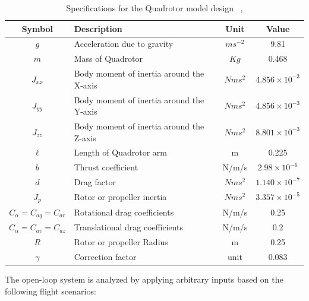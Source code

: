 \begin{table}[h!]
\centering
\caption{Specifications for the Quadrotor model design ~\cite{ahmed2018sliding},\cite{bernard2017dynamic}}
\label{tab:quad_params}
\begin{tabular}{|c|l|c|c|}
\hline
\textbf{Symbol} & \textbf{Description} & \textbf{Unit} & \textbf{Value} \\ \hline
$g$     & Acceleration due to gravity              & $ms^{-2}$  & 9.81 \\ \hline
$m$     & Mass of Quadrotor                        & $Kg$       & 0.468 \\ \hline
$J_{xx}$ & Body moment of inertia around the X-axis & $Nms^2$    & $4.856 \times 10^{-3}$ \\ \hline
$J_{yy}$ & Body moment of inertia around the Y-axis & $Nms^2$    & $4.856 \times 10^{-3}$ \\ \hline
$J_{zz}$ & Body moment of inertia around the Z-axis & $Nms^2$    & $8.801 \times 10^{-3}$ \\ \hline
$\ell$   & Length of Quadrotor arm                 & m          & 0.225 \\ \hline
$b$     & Thrust coefficient                       & N/m/s      & $2.98 \times 10^{-6}$ \\ \hline
$d$     & Drag factor                              & $Nms^2$    & $1.140 \times 10^{-7}$ \\ \hline
$J_p$   & Rotor or propeller inertia               & $Nms^2$    & $3.357 \times 10^{-5}$ \\ \hline
$C_{\alpha} = C_{aq} = C_{ar}$ & Rotational drag coefficients & N/m/s & 0.25 \\ \hline
$C_{\alpha} = C_{av} = C_{az}$ & Translational drag coefficients & N/m/s & 0.2 \\ \hline
$R$     & Rotor or propeller Radius                & m          & 0.25 \\ \hline
$\gamma$& Correction factor                        & unit       & 0.083 \\ \hline
\end{tabular}
\end{table}

The open-loop system is analyzed by applying arbitrary inputs based on the following 
flight scenarios:

